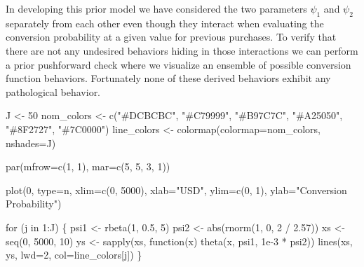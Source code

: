 \documentclass[
  letterpaper,
  DIV=11,
  numbers=noendperiod]{scrartcl}
\newenvironment{Shaded}{\begin{snugshade}}{\end{snugshade}}
\newcommand{\AttributeTok}[1]{\textcolor[rgb]{0.40,0.45,0.13}{#1}}
\newcommand{\ControlFlowTok}[1]{\textcolor[rgb]{0.00,0.23,0.31}{#1}}
\newcommand{\DecValTok}[1]{\textcolor[rgb]{0.68,0.00,0.00}{#1}}
\newcommand{\FloatTok}[1]{\textcolor[rgb]{0.68,0.00,0.00}{#1}}
\newcommand{\FunctionTok}[1]{\textcolor[rgb]{0.28,0.35,0.67}{#1}}
\newcommand{\NormalTok}[1]{\textcolor[rgb]{0.00,0.23,0.31}{#1}}
\newcommand{\OtherTok}[1]{\textcolor[rgb]{0.00,0.23,0.31}{#1}}
\newcommand{\SpecialCharTok}[1]{\textcolor[rgb]{0.37,0.37,0.37}{#1}}
\newcommand{\StringTok}[1]{\textcolor[rgb]{0.13,0.47,0.30}{#1}}
\begin{document}
In developing this prior model we have considered the two parameters
\(\psi_{1}\) and \(\psi_{2}\) separately from each other even though
they interact when evaluating the conversion probability at a given
value for previous purchases. To verify that there are not any undesired
behaviors hiding in those interactions we can perform a prior
pushforward check where we visualize an ensemble of possible conversion
function behaviors. Fortunately none of these derived behaviors exhibit
any pathological behavior.

\begin{Shaded}
\begin{Highlighting}[]
\NormalTok{J }\OtherTok{\textless{}{-}} \DecValTok{50}
\NormalTok{nom\_colors }\OtherTok{\textless{}{-}} \FunctionTok{c}\NormalTok{(}\StringTok{"\#DCBCBC"}\NormalTok{, }\StringTok{"\#C79999"}\NormalTok{, }\StringTok{"\#B97C7C"}\NormalTok{,}
                \StringTok{"\#A25050"}\NormalTok{, }\StringTok{"\#8F2727"}\NormalTok{, }\StringTok{"\#7C0000"}\NormalTok{)}
\NormalTok{line\_colors }\OtherTok{\textless{}{-}} \FunctionTok{colormap}\NormalTok{(}\AttributeTok{colormap=}\NormalTok{nom\_colors, }\AttributeTok{nshades=}\NormalTok{J)}

\FunctionTok{par}\NormalTok{(}\AttributeTok{mfrow=}\FunctionTok{c}\NormalTok{(}\DecValTok{1}\NormalTok{, }\DecValTok{1}\NormalTok{), }\AttributeTok{mar=}\FunctionTok{c}\NormalTok{(}\DecValTok{5}\NormalTok{, }\DecValTok{5}\NormalTok{, }\DecValTok{3}\NormalTok{, }\DecValTok{1}\NormalTok{))}

\FunctionTok{plot}\NormalTok{(}\DecValTok{0}\NormalTok{, }\AttributeTok{type=}\StringTok{\textquotesingle{}n\textquotesingle{}}\NormalTok{,}
     \AttributeTok{xlim=}\FunctionTok{c}\NormalTok{(}\DecValTok{0}\NormalTok{, }\DecValTok{5000}\NormalTok{), }\AttributeTok{xlab=}\StringTok{"USD"}\NormalTok{,}
     \AttributeTok{ylim=}\FunctionTok{c}\NormalTok{(}\DecValTok{0}\NormalTok{, }\DecValTok{1}\NormalTok{), }\AttributeTok{ylab=}\StringTok{"Conversion Probability"}\NormalTok{)}

\ControlFlowTok{for}\NormalTok{ (j }\ControlFlowTok{in} \DecValTok{1}\SpecialCharTok{:}\NormalTok{J) \{}
\NormalTok{  psi1 }\OtherTok{\textless{}{-}} \FunctionTok{rbeta}\NormalTok{(}\DecValTok{1}\NormalTok{, }\FloatTok{0.5}\NormalTok{, }\DecValTok{5}\NormalTok{)}
\NormalTok{  psi2 }\OtherTok{\textless{}{-}} \FunctionTok{abs}\NormalTok{(}\FunctionTok{rnorm}\NormalTok{(}\DecValTok{1}\NormalTok{, }\DecValTok{0}\NormalTok{, }\DecValTok{2} \SpecialCharTok{/} \FloatTok{2.57}\NormalTok{))}
\NormalTok{  xs }\OtherTok{\textless{}{-}} \FunctionTok{seq}\NormalTok{(}\DecValTok{0}\NormalTok{, }\DecValTok{5000}\NormalTok{, }\DecValTok{10}\NormalTok{)}
\NormalTok{  ys }\OtherTok{\textless{}{-}} \FunctionTok{sapply}\NormalTok{(xs, }\ControlFlowTok{function}\NormalTok{(x) }\FunctionTok{theta}\NormalTok{(x, psi1, }\FloatTok{1e{-}3} \SpecialCharTok{*}\NormalTok{ psi2))}
  \FunctionTok{lines}\NormalTok{(xs, ys, }\AttributeTok{lwd=}\DecValTok{2}\NormalTok{, }\AttributeTok{col=}\NormalTok{line\_colors[j])}
\NormalTok{\}}
\end{Highlighting}
\end{Shaded}
\end{document}
